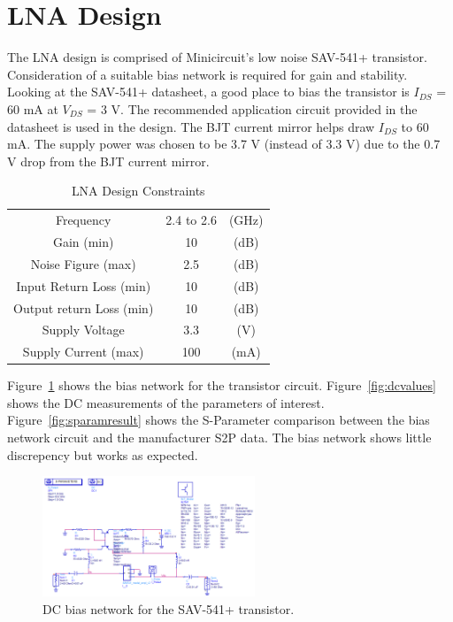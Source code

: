 \documentclass[conference]{IEEEtran}
\begin{document}
\section{LNA Design}
The LNA design is comprised of Minicircuit's low noise SAV-541+ transistor.  Consideration of a suitable bias network is required for gain and stability.  Looking at the SAV-541+ datasheet\cite{sav541datasheet}, a good place to bias the transistor is $I_{DS}$ = 60 mA at $V_{DS}$ = 3 V.  The recommended application circuit provided in the datasheet is used in the design.   The BJT current mirror helps draw $I_{DS}$ to 60 mA.  The supply power was chosen to be 3.7 V (instead of 3.3 V) due to the 0.7 V drop from the BJT current mirror.

\begin{table}[!b]
\caption{LNA Design Constraints}
\centering
    \begin{tabular}{c c c}
    
  	Frequency & 2.4 to 2.6 & (GHz)\\
	Gain (min) & 10 & (dB)\\
	Noise Figure (max) & 2.5 & (dB)\\
	Input Return Loss (min) & 10 & (dB)\\
	Output return Loss (min) & 10 & (dB)\\
	Supply Voltage & 3.3 & (V)\\
	Supply Current (max) & 100 & (mA)\\
    \end{tabular}
\label{tab:specs}
\end{table}

Figure~\ref{fig:dccircuit} shows the bias network for the transistor circuit.  Figure~\ref{fig:dcvalues} shows the DC measurements of the parameters of interest.  Figure~\ref{fig:sparamresult} shows the S-Parameter comparison between the bias network circuit and the manufacturer S2P data.  The bias network shows little discrepency but works as expected.

\begin{figure}[!h]
\centering
\includegraphics[width=2.5in]{pics/DCBiasNetwork.png}
\caption{DC bias network for the SAV-541+ transistor.}
\label{fig:dccircuit}
\end{figure}
\end{document}
